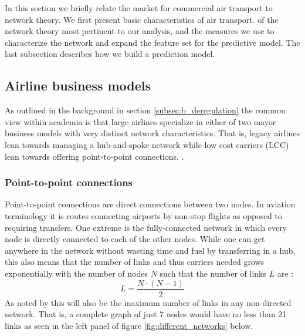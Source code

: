 \label{sec:theory}
In this section we briefly relate the market for commercial air transport to network theory. We first present basic characteristics of air transport.  of the network theory most pertinent to our analysis, and the measures we use to characterize the network and expand the feature set for the predictive model. The last subsection describes how we build a prediction model. 

\subsection{Airline business models}
As outlined in the background in section \ref{subsec:b_deregulation} the common view within academia is that large airlines specialize in either of two mayor business models with very distinct network characteristics. That is, legacy airlines lean towards managing a hub-and-spoke network while low cost carriers (LCC) lean towards offering point-to-point connections. \citep{daraban2012low,baker2013service,marti2015efficiency}.

\subsubsection{Point-to-point connections}
Point-to-point connections are direct connections between two nodes. In aviation terminology it is routes connecting airports by non-stop flights as opposed to requiring transfers. One extreme is the fully-connected network in which every node is directly connected to each of the other nodes. While one can get anywhere in the network without wasting time and fuel by transferring in a hub, this also means that the number of links and thus carriers needed grows exponentially with the number of nodes $N$ such that the number of links $L$ are \citep{bryan1999hub}:
\begin{equation}
  L=\frac{N\cdot(N-1)}{2}
  \label{eq:max_links}
\end{equation}
As noted by \citet{barabasi2016networks} this will also be the maximum number of links in any non-directed network. That is, a complete graph of just 7 nodes would have no less than 21 links as seen in the left panel of figure \ref{fig:different_networks} below.

